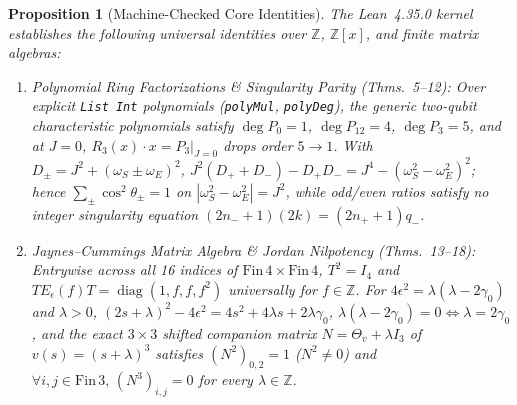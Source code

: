 \documentclass[10pt,twocolumn]{article}
\newtheorem{proposition}{Proposition}
\newcommand{\ZZ}{\mathbb{Z}}
\begin{document}
\begin{proposition}[Machine-Checked Core Identities]\label{prop:lean}
The Lean~4.35.0 kernel establishes the following universal identities over $\ZZ$, $\ZZ[x]$, and finite matrix algebras:
\begin{enumerate}[leftmargin=*,nosep]
  \item \emph{Polynomial Ring Factorizations \& Singularity Parity (Thms.~5--12):} Over explicit \texttt{List Int} polynomials (\texttt{polyMul}, \texttt{polyDeg}), the generic two-qubit characteristic polynomials satisfy $\deg P_0 = 1$, $\deg P_{12} = 4$, $\deg P_3 = 5$, and at $J=0$, $R_3(x)\cdot x = P_3|_{J=0}$ drops order $5 \to 1$. With $D_\pm = J^2 + (\omega_S \pm \omega_E)^2$, $J^2(D_+ + D_-) - D_+ D_- = J^4 - (\omega_S^2 - \omega_E^2)^2$; hence $\sum_\pm \cos^2 \theta_\pm = 1$ on $|\omega_S^2 - \omega_E^2| = J^2$, while odd/even ratios satisfy no integer singularity equation $(2n_- + 1)(2k) = (2n_+ + 1)q_-$.
  \item \emph{Jaynes--Cummings Matrix Algebra \& Jordan Nilpotency (Thms.~13--18):} Entrywise across all 16 indices of $\mathrm{Fin}\,4 \times \mathrm{Fin}\,4$, $T^2 = I_4$ and $T E_\epsilon(f) T = \operatorname{diag}(1, f, f, f^2)$ universally for $f \in \ZZ$. For $4\epsilon^2 = \lambda(\lambda - 2\gamma_0)$ and $\lambda > 0$, $(2s+\lambda)^2 - 4\epsilon^2 = 4s^2 + 4\lambda s + 2\lambda\gamma_0$, $\lambda(\lambda - 2\gamma_0) = 0 \iff \lambda = 2\gamma_0$, and the exact $3\times 3$ shifted companion matrix $N = \Theta_v + \lambda I_3$ of $v(s) = (s+\lambda)^3$ satisfies $(N^2)_{0,2} = 1$ ($N^2 \neq 0$) and $\forall i,j \in \mathrm{Fin}\,3,\,(N^3)_{i,j} = 0$ for every $\lambda \in \ZZ$.
\end{enumerate}
\end{proposition}
\end{document}
